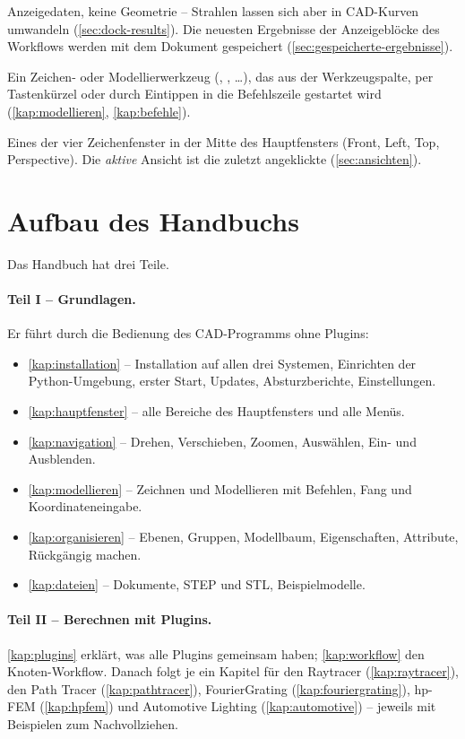 \begin{description}
    Anzeigedaten, keine Geometrie -- Strahlen lassen sich aber in CAD-Kurven umwandeln
    (\autoref{sec:dock-results}). Die neuesten Ergebnisse der Anzeigeblöcke des Workflows
    werden mit dem Dokument gespeichert (\autoref{sec:gespeicherte-ergebnisse}).
  \item[Befehl] Ein Zeichen- oder Modellierwerkzeug (,
    ,  \dots), das aus der Werkzeugspalte, per Tastenkürzel oder durch
    Eintippen in die Befehlszeile gestartet wird (\autoref{kap:modellieren},
    \autoref{kap:befehle}).
  \item[Ansicht (Viewport)] Eines der vier Zeichenfenster in der Mitte des
    Hauptfensters (Front, Left, Top, Perspective). Die \emph{aktive} Ansicht ist die zuletzt
    angeklickte (\autoref{sec:ansichten}).
\end{description}

\section{Aufbau des Handbuchs}\label{sec:aufbau}

Das Handbuch hat drei Teile.

\paragraph{Teil I -- Grundlagen.} Er führt durch die Bedienung des CAD-Programms ohne
Plugins:
\begin{itemize}
  \item \autoref{kap:installation} -- Installation auf allen drei Systemen, Einrichten der
    Python-Umgebung, erster Start, Updates, Absturzberichte, Einstellungen.
  \item \autoref{kap:hauptfenster} -- alle Bereiche des Hauptfensters und alle Menüs.
  \item \autoref{kap:navigation} -- Drehen, Verschieben, Zoomen, Auswählen, Ein- und
    Ausblenden.
  \item \autoref{kap:modellieren} -- Zeichnen und Modellieren mit Befehlen, Fang und
    Koordinateneingabe.
  \item \autoref{kap:organisieren} -- Ebenen, Gruppen, Modellbaum, Eigenschaften, Attribute,
    Rückgängig machen.
  \item \autoref{kap:dateien} -- Dokumente, STEP und STL, Beispielmodelle.
\end{itemize}

\paragraph{Teil II -- Berechnen mit Plugins.} \autoref{kap:plugins} erklärt, was alle
Plugins gemeinsam haben; \autoref{kap:workflow} den Knoten-Workflow. Danach folgt je ein
Kapitel für den Raytracer (\autoref{kap:raytracer}), den Path Tracer
(\autoref{kap:pathtracer}), FourierGrating (\autoref{kap:fouriergrating}), hp-FEM
(\autoref{kap:hpfem}) und Automotive
Lighting (\autoref{kap:automotive}) -- jeweils mit Beispielen zum Nachvollziehen.

